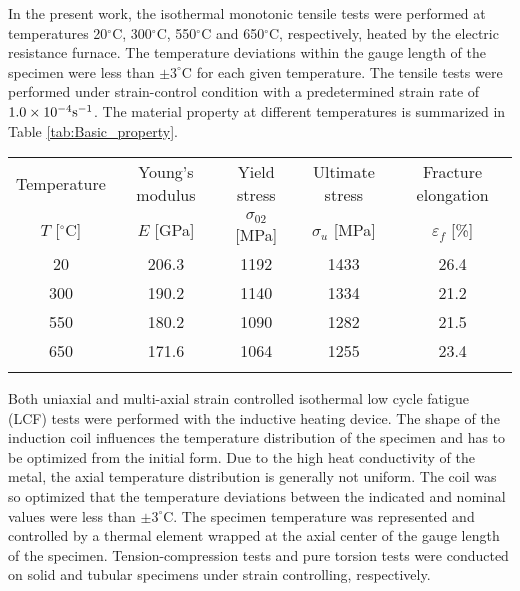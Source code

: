 \documentclass[preprint,5p,twocolumn,11pt,sort&compress]{elsarticle}
\begin{document}
In the present work, the isothermal monotonic tensile tests were performed at temperatures 20$^{\circ}$C, 300$^{\circ}$C, 550$^{\circ}$C and 650$^{\circ}$C, respectively, heated by the electric resistance furnace. The temperature deviations within the gauge length of the specimen were less than $\pm3^{\circ}$C for each given temperature. The tensile tests were performed under strain-control condition with a predetermined strain rate of $1.0\times 10^{-4}\rm{s}^{-1}$.
The material property at different temperatures is summarized in Table \ref{tab:Basic_property}.

\begin{table*}[htbp]
  \centering
  \caption{Fundamental mechanical property from isothermal tensile tests.}
    \begin{tabular}{ccccc}
    \hline
    Temperature         & Young's modulus   & Yield stress            & Ultimate stress     & Fracture elongation\\
    $T$ [$^{\circ}$C]   & $E$ [GPa]         & $\sigma_{02}$ [MPa]  & $\sigma_u$ [MPa]    & $\varepsilon_f$ [\%]\\
    \hline
    20    & 206.3 & 1192 & 1433 & 26.4 \\
    300   & 190.2 & 1140 & 1334 & 21.2 \\
    550   & 180.2 & 1090 & 1282 & 21.5 \\
    650   & 171.6 & 1064 & 1255 & 23.4 \\
    \hline \\
    \end{tabular}%
  \label{tab:Basic_property}%
\end{table*}%

Both uniaxial and multi-axial strain controlled isothermal low cycle fatigue (LCF) tests were performed with the inductive heating device. The shape of the induction coil influences the temperature distribution of the specimen and has to be optimized from the initial form. Due to the high heat conductivity of the metal, the axial temperature distribution is generally not uniform. The coil was so optimized that the temperature deviations between the indicated and nominal values were less than $\pm3^{\circ}$C.
The specimen temperature was represented and controlled by a thermal element wrapped at the axial center of the gauge length of the specimen.
Tension-compression tests and pure torsion tests were conducted on solid and tubular specimens under strain controlling, respectively. 
\end{document}
